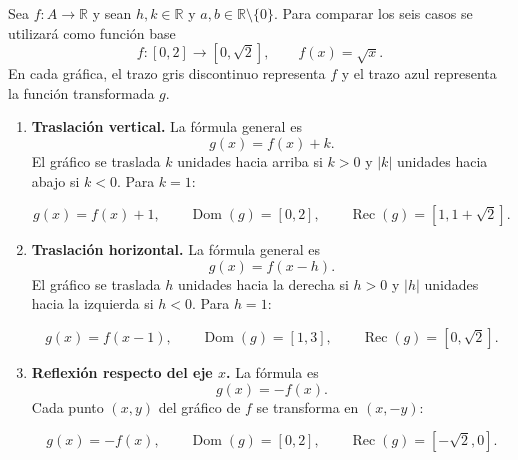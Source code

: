 \documentclass[10pt,a5paper]{article}
\begin{document}
\begin{proposicion}[de transformación]
Sea $f:A\to\mathbb{R}$ y sean $h,k\in\mathbb{R}$ y $a,b\in\mathbb{R}\setminus\{0\}$. Para comparar los seis casos se utilizará como función base
\[
f:[0,2]\to[0,\sqrt2],\qquad f(x)=\sqrt{x}.
\]
En cada gráfica, el trazo gris discontinuo representa $f$ y el trazo azul representa la función transformada $g$.

\begin{enumerate}
\item \textbf{Traslación vertical.} La fórmula general es
\[
g(x)=f(x)+k.
\]
El gráfico se traslada $k$ unidades hacia arriba si $k>0$ y $|k|$ unidades hacia abajo si $k<0$. Para $k=1$:
\begin{center}
\[
g(x)=f(x)+1,\qquad
\operatorname{Dom}(g)=[0,2],\qquad
\operatorname{Rec}(g)=[1,1+\sqrt2].
\]
\end{center}

\item \textbf{Traslación horizontal.} La fórmula general es
\[
g(x)=f(x-h).
\]
El gráfico se traslada $h$ unidades hacia la derecha si $h>0$ y $|h|$ unidades hacia la izquierda si $h<0$. Para $h=1$:
\begin{center}
\[
g(x)=f(x-1),\qquad
\operatorname{Dom}(g)=[1,3],\qquad
\operatorname{Rec}(g)=[0,\sqrt2].
\]
\end{center}

\item \textbf{Reflexión respecto del eje $x$.} La fórmula es
\[
g(x)=-f(x).
\]
Cada punto $(x,y)$ del gráfico de $f$ se transforma en $(x,-y)$:
\begin{center}
\[
g(x)=-f(x),\qquad
\operatorname{Dom}(g)=[0,2],\qquad
\operatorname{Rec}(g)=[-\sqrt2,0].
\]
\end{center}


\end{enumerate}
\end{proposicion}
\end{document}

